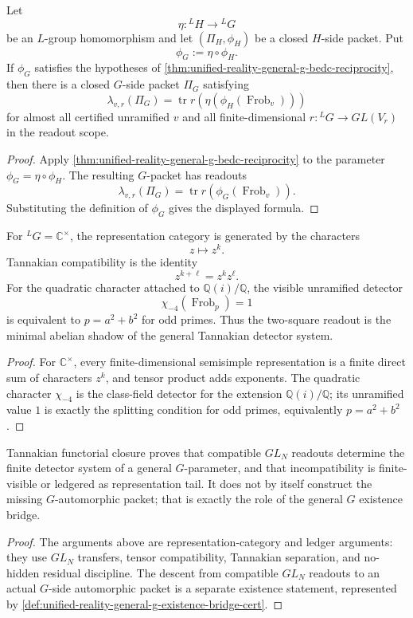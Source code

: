 \begin{theorem}
\label{thm:unified-reality-tannakian-functoriality-closure}
Let
$$
\eta:{}^LH\to{}^LG
$$
be an $L$-group homomorphism and let $(\Pi_H,\phi_H)$ be a closed
$H$-side packet. Put
$$
\phi_G:=\eta\circ\phi_H.
$$
If $\phi_G$ satisfies the hypotheses of
\autoref{thm:unified-reality-general-g-bedc-reciprocity}, then there is
a closed $G$-side packet $\Pi_G$ satisfying
$$
\lambda_{v,r}(\Pi_G)
=
\operatorname{tr}r(\eta(\phi_H(\operatorname{Frob}_v)))
$$
for almost all certified unramified $v$ and all finite-dimensional
$r:{}^LG\to GL(V_r)$ in the readout scope.
\end{theorem}
\begin{proof}
Apply
\autoref{thm:unified-reality-general-g-bedc-reciprocity} to the
parameter $\phi_G=\eta\circ\phi_H$. The resulting $G$-packet has
readouts
$$
\lambda_{v,r}(\Pi_G)
=
\operatorname{tr}r(\phi_G(\operatorname{Frob}_v)).
$$
Substituting the definition of $\phi_G$ gives the displayed formula.
\end{proof}

\begin{corollary}
\label{cor:unified-reality-gl1-minimal-tannakian-model}
For ${}^LG=\mathbb C^\times$, the representation category is generated
by the characters
$$
z\mapsto z^k.
$$
Tannakian compatibility is the identity
$$
z^{k+\ell}=z^kz^\ell.
$$
For the quadratic character attached to $\mathbb Q(i)/\mathbb Q$, the
visible unramified detector
$$
\chi_{-4}(\operatorname{Frob}_p)=1
$$
is equivalent to $p=a^2+b^2$ for odd primes. Thus the two-square
readout is the minimal abelian shadow of the general Tannakian detector
system.
\end{corollary}
\begin{proof}
For $\mathbb C^\times$, every finite-dimensional semisimple
representation is a finite direct sum of characters $z^k$, and tensor
product adds exponents. The quadratic character $\chi_{-4}$ is the
class-field detector for the extension $\mathbb Q(i)/\mathbb Q$; its
unramified value $1$ is exactly the splitting condition for odd primes,
equivalently $p=a^2+b^2$.
\end{proof}

\begin{theorem}
\label{thm:unified-reality-tannakian-closure-boundary}
Tannakian functorial closure proves that compatible $GL_N$ readouts
determine the finite detector system of a general $G$-parameter, and
that incompatibility is finite-visible or ledgered as representation
tail. It does not by itself construct the missing $G$-automorphic
packet; that is exactly the role of the general $G$ existence bridge.
\end{theorem}
\begin{proof}
The arguments above are representation-category and ledger arguments:
they use $GL_N$ transfers, tensor compatibility, Tannakian separation,
and no-hidden residual discipline. The descent from compatible
$GL_N$ readouts to an actual $G$-side automorphic packet is a separate
existence statement, represented by
\autoref{def:unified-reality-general-g-existence-bridge-cert}.
\end{proof}
